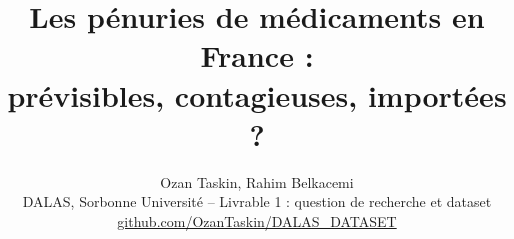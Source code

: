 
\title{\vspace{-1.6cm}\textbf{Les pénuries de médicaments en France :\\ prévisibles, contagieuses, importées ?}}
\author{Ozan Taskin, Rahim Belkacemi\\[2pt]
  \small DALAS, Sorbonne Université -- Livrable 1 : question de recherche et dataset\\
  \small \href{https://github.com/OzanTaskin/DALAS_DATASET}{github.com/OzanTaskin/DALAS\_DATASET}}
\date{\vspace{-1.0cm}}
